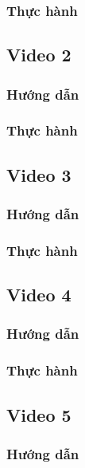 \documentclass{article}
\begin{document}
 



\subsubsection{Thực hành}



\subsection{Video 2}
\subsubsection{Hướng dẫn}

\subsubsection{Thực hành}




\subsection{Video 3}
\subsubsection{Hướng dẫn}

\subsubsection{Thực hành}




\subsection{Video 4}
\subsubsection{Hướng dẫn}

\subsubsection{Thực hành}




\subsection{Video 5}
\subsubsection{Hướng dẫn}
\end{document}
